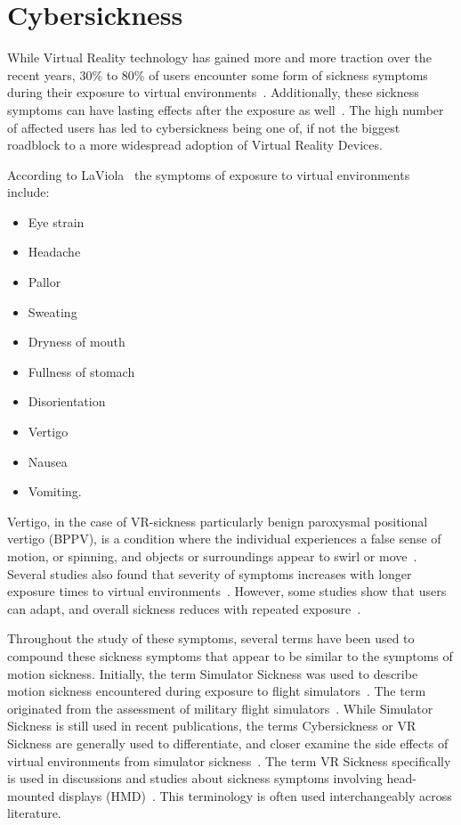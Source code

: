 \section{Cybersickness}\label{sec:cybersickness}

While Virtual Reality technology has gained more and more traction over the recent years, 30\% to 80\% of users
encounter some form of sickness symptoms during their exposure to virtual environments~\cite{Rebenitsch2016}.
Additionally, these sickness symptoms can have lasting effects after the exposure as well~\cite{LaViola2000}.
The high number of affected users has led to cybersickness being one of, if not the biggest roadblock to a more
widespread adoption of Virtual Reality Devices.

According to LaViola~\cite{LaViola2000} the symptoms of exposure to virtual environments include:
\begin{itemize}
    \item Eye strain
    \item Headache
    \item Pallor
    \item Sweating
    \item Dryness of mouth
    \item Fullness of stomach
    \item Disorientation
    \item Vertigo
    \item Nausea
    \item Vomiting.
\end{itemize}
Vertigo, in the case of VR-sickness particularly benign paroxysmal positional vertigo (BPPV), is a condition where the
individual experiences a false sense of motion, or spinning, and objects or surroundings appear to swirl or
move~\cite{Post2010}.
Several studies also found that severity of symptoms increases with longer exposure times to virtual environments~\cite{Ruddle2004,Min2004,Duzmanska2018}.
However, some studies show that users can adapt, and overall sickness reduces with repeated exposure~\cite{Hill2000}.

Throughout the study of these symptoms, several terms have been used to compound these sickness symptoms that appear
to be similar to the symptoms of motion sickness.
Initially, the term Simulator Sickness was used to describe motion sickness encountered during exposure to flight
simulators~\cite{Saredakis2020}.
The term originated from the assessment of military flight simulators~\cite{Kennedy1993}.
While Simulator Sickness is still used in recent publications, the terms Cybersickness or VR Sickness are generally used
to differentiate, and closer examine the side effects of virtual environments from simulator
sickness~\cite{Saredakis2020,McCauley1992}.
The term VR Sickness specifically is used in discussions and studies about sickness symptoms involving head-mounted
displays (HMD)~\cite{Kim2018,Cobb1999}.
This terminology is often used interchangeably across literature.

